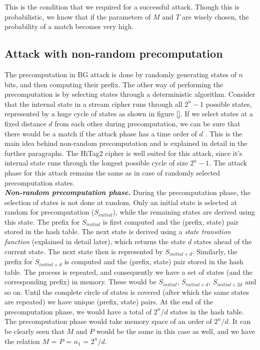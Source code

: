This is the condition that we required for a successful attack. Though this is probabilistic, we know that if the parameters of $M$ and $T$ are wisely chosen, the probability of a match becomes very high.

\subsection{Attack with non-random precomputation}
\label{sec:bg-nr}

The precomputation in BG attack is done by randomly generating states of $n$ bits, and then computing their prefix. The other way of performing the precomputation is by selecting states through a deterministic algorithm. Consider that the internal state in a stream cipher runs through all $2^n - 1$ possible states, represented by a huge cycle of states as shown in figure \ref{}. If we select states at a fixed distance $d$ from each other during precomputation, we can be sure that there would be a match if the attack phase has a time order of $d$ \cite{erik-discussions}. This is the main idea behind non-random precomputation and is explained in detail in the further paragraphs. The HiTag2 cipher is well suited for this attack, since it's internal state runs through the longest possible cycle of size $2^n - 1$. The attack phase for this attack remains the same as in case of randomly selected precomputation states.\\

\indent \textit{\textbf{Non-random precomputation phase.}} During the precomputation phase, the selection of states is not done at random. Only an initial state is selected at random for precomputation ($S_{initial}$), while the remaining states are derived using this state. The prefix for $S_{initial}$ is first computed and the (prefix, state) pair stored in the hash table. The next state is derived using a \emph{state transition function} (explained in detail later), which returns the state $d$ states ahead of the current state. The next state then is represented by $S_{initial+d}$. Similarly, the prefix for $S_{initial+d}$ is computed and the (prefix, state) pair stored in the hash table. The process is repeated, and consequently we have a set of states (and the corresponding prefix) in memory. These would be $S_{initial}$, $S_{initial+d}$, $S_{initial+2d}$ and so on. Until the complete circle of states is covered (after which the same states are repeated) we have unique (prefix, state) pairs. At the end of the precomputation phase, we would have a total of $2^n/d$ states in the hash table. The precomputation phase would take memory space of an order of $2^n/d$. It can be clearly seen that $M$ and $P$ would be the same in this case as well, and we have the relation $M$ = $P$ = $n_1$ = $2^n/d$.\\

